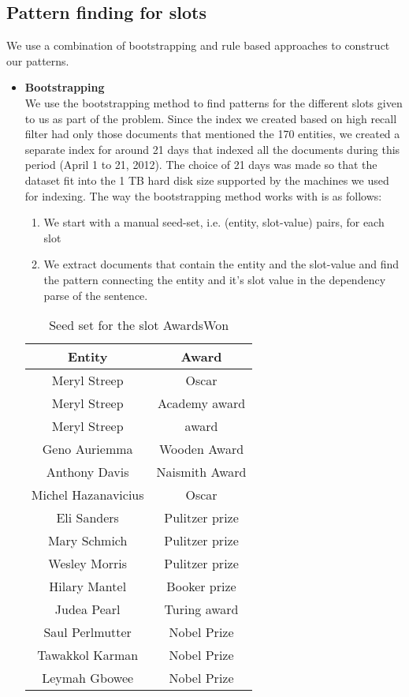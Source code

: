 \subsection{Pattern finding for slots}
We use a combination of bootstrapping and rule based approaches to construct our patterns.
\begin{itemize}
\item \textbf{Bootstrapping} \\
We use the bootstrapping method to find patterns for the different slots given to us as part of the problem. Since the index we created based on high recall filter had only those documents that mentioned the 170 entities, we created a separate index for around 21 days that indexed all the documents during this period (April 1 to 21, 2012). The choice of 21 days was made so that the dataset fit into the 1 TB hard disk size supported by the machines we used for indexing. The way the bootstrapping method works with is as follows:
\begin{enumerate}
\item We start with a manual seed-set, i.e. (entity, slot-value) pairs, for each slot
\item We extract documents that contain the entity and the slot-value and find the pattern connecting the entity and it’s slot value in the dependency parse of the sentence. 
\end{enumerate}

\begin{table}[ht]
\centering
\begin{tabular}{|c|c|}
\hline
Entity & Award \\
\hline
Meryl Streep & Oscar \\
Meryl Streep & Academy award \\
Meryl Streep & award \\
Geno Auriemma & Wooden Award \\
Anthony Davis & Naismith Award \\
Michel Hazanavicius & Oscar \\
Eli Sanders & Pulitzer prize \\ 
Mary Schmich & Pulitzer prize \\
Wesley Morris & Pulitzer prize \\
Hilary Mantel & Booker prize \\
Judea Pearl & Turing award \\
Saul Perlmutter & Nobel Prize \\
Tawakkol Karman & Nobel Prize \\ 
Leymah Gbowee & Nobel Prize \\
\hline
\end{tabular}
\caption{Seed set for the slot AwardsWon}
\label{tab:seedset_awardsWon}
\end{table}



\end{itemize}
